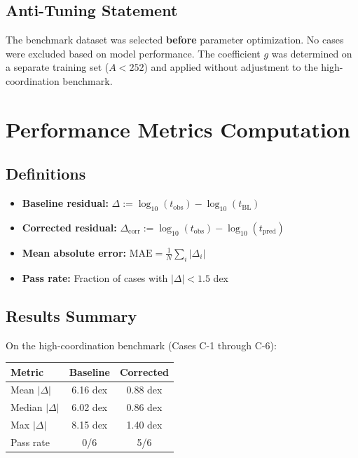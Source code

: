 \subsection{Anti-Tuning Statement}

The benchmark dataset was selected \textbf{before} parameter optimization.
No cases were excluded based on model performance. The coefficient $g$ was
determined on a separate training set ($A < 252$) and applied without
adjustment to the high-coordination benchmark.

\section{Performance Metrics Computation}
\label{sec:q:metrics}

\subsection{Definitions}

\begin{itemize}
    \item \textbf{Baseline residual:}
          $\Delta := \log_{10}(t_{\text{obs}}) - \log_{10}(t_{\text{BL}})$
    \item \textbf{Corrected residual:}
          $\Delta_{\text{corr}} := \log_{10}(t_{\text{obs}}) - \log_{10}(t_{\text{pred}})$
    \item \textbf{Mean absolute error:}
          $\text{MAE} = \frac{1}{N}\sum_i |\Delta_i|$
    \item \textbf{Pass rate:}
          Fraction of cases with $|\Delta| < 1.5$ dex
\end{itemize}

\subsection{Results Summary}

On the high-coordination benchmark (Cases C-1 through C-6):

\begin{center}
\begin{tabular}{lcc}
    \toprule
    Metric & Baseline & Corrected \\
    \midrule
    Mean $|\Delta|$ & 6.16 dex & 0.88 dex \\
    Median $|\Delta|$ & 6.02 dex & 0.86 dex \\
    Max $|\Delta|$ & 8.15 dex & 1.40 dex \\
    Pass rate & 0/6 & 5/6 \\
    \bottomrule
\end{tabular}
\end{center}

